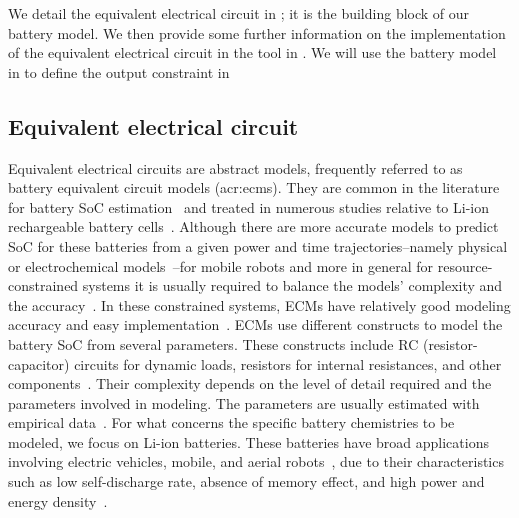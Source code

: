 We detail the equivalent electrical circuit in ; it is the building block of our battery model. We then provide some further information on the implementation of the equivalent electrical circuit in the \powprof{} tool in . We will use the battery model in  to define the output constraint in 

\subsection{Equivalent electrical circuit}
\label{sec:batmod-circuit}

Equivalent electrical circuits are abstract models, frequently referred to as battery equivalent circuit models (\Gls{acr:ecm}s). They are common in the literature for battery SoC estimation~\citep{zhang2018online} and treated in numerous studies relative to Li-ion rechargeable battery cells~\citep{hinz2019comparison,hasan2018exogenous}. Although there are more accurate models to predict SoC for these batteries from a given power and time trajectories--namely physical or electrochemical models~\citep{rao2003battery}--for mobile robots and more in general for resource-constrained systems it is usually required to balance the models' complexity and the accuracy~\citep{rao2003battery,hasan2018exogenous}. In these constrained systems, ECMs have relatively good modeling accuracy and easy implementation~\citep{zhang2018online,zhang2012estimation,zhang2009battery,saeed2019electrical,hasan2018exogenous}. ECMs use different constructs to model the battery SoC from several parameters. These constructs include RC (resistor-capacitor) circuits for dynamic loads, resistors for internal resistances, and other components~\citep{hamza2017forecasting}. Their complexity depends on the level of detail required and the parameters involved in modeling. The parameters are usually estimated with empirical data~\citep{zhang2014battery}.
For what concerns the specific battery chemistries to be modeled, we focus on Li-ion batteries. These batteries have broad applications involving electric vehicles, mobile, and aerial robots~\citep{shi2006application,xia2015state,hasan2018exogenous,zhang2014battery}, due to their characteristics such as low self-discharge rate, absence of memory effect, and high power and energy density~\citep{zhang2014battery}.

